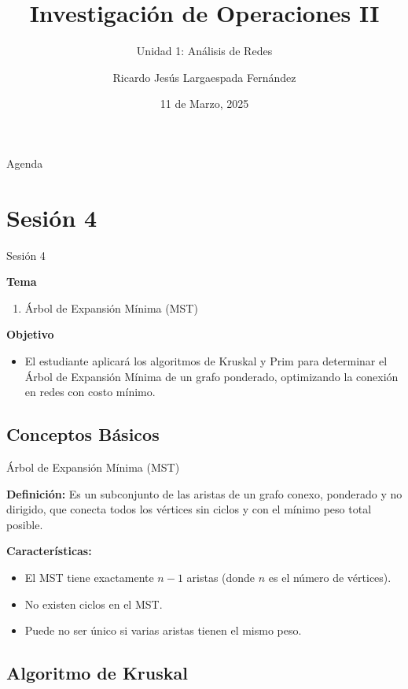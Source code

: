 \documentclass{beamer}
\title{Investigación de Operaciones II}
\subtitle{Unidad 1: Análisis de Redes}
\author{Ricardo Jesús Largaespada Fernández}
\institute{Ingeniería de Sistemas, DACTIC, UNI}
\date{11 de Marzo, 2025}
\begin{document}
\frame{\titlepage}

\begin{frame}{Agenda}
    \tableofcontents
\end{frame}

\section{Sesión 4}
\begin{frame}{Sesión 4}

\textbf{Tema}
\begin{enumerate}
    \item Árbol de Expansión Mínima (MST)
\end{enumerate}

\textbf{Objetivo}
\begin{itemize}
    \item El estudiante aplicará los algoritmos de Kruskal y Prim para determinar el Árbol de Expansión Mínima de un grafo ponderado, optimizando la conexión en redes con costo mínimo.
\end{itemize}

\end{frame}

\subsection{Conceptos Básicos}

\begin{frame}{Árbol de Expansión Mínima (MST)}

\textbf{Definición:}  
Es un subconjunto de las aristas de un grafo conexo, ponderado y no dirigido, que conecta todos los vértices sin ciclos y con el mínimo peso total posible.

\textbf{Características:}
\begin{itemize}
    \item El MST tiene exactamente $n-1$ aristas (donde $n$ es el número de vértices).
    \item No existen ciclos en el MST.
    \item Puede no ser único si varias aristas tienen el mismo peso.
\end{itemize}

\end{frame}

\subsection{Algoritmo de Kruskal}
\end{document}
